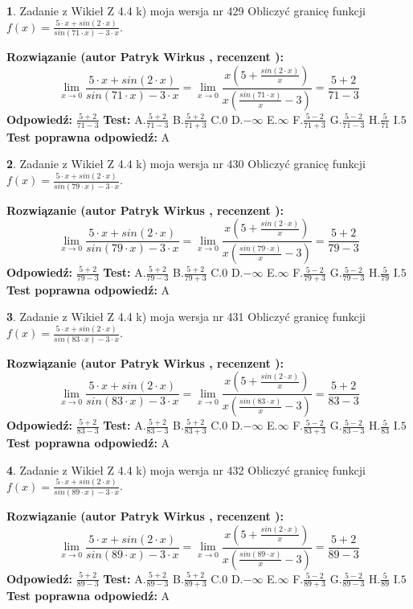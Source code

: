 \documentclass[12pt, a4paper]{article}
\theoremstyle{definition} %
\newtheorem{zad}{}
\newcommand{\zadStart}[1]{\begin{zad}#1\newline}
\newcommand{\zadStop}{\end{zad}}
\newcommand{\rozwStart}[2]{\noindent \textbf{Rozwiązanie (autor #1 , recenzent #2): }\newline}
\newcommand{\rozwStop}{\newline}
\newcommand{\odpStart}{\noindent \textbf{Odpowiedź:}\newline}
\newcommand{\odpStop}{\newline}
\newcommand{\testStart}{\noindent \textbf{Test:}\newline}
\newcommand{\testStop}{\newline}
\newcommand{\kluczStart}{\noindent \textbf{Test poprawna odpowiedź:}\newline}
\newcommand{\kluczStop}{\newline}
\begin{document}
\zadStart{Zadanie z Wikieł Z 4.4 k) moja wersja nr 429}
Obliczyć granicę funkcji $f(x)=\frac{5\cdot x +sin(2\cdot x)}{sin(71\cdot x) -3\cdot x}$.
\zadStop
\rozwStart{Patryk Wirkus}{}
$$\lim\limits_{x\to 0}\frac{5\cdot x +sin(2\cdot x)}{sin(71\cdot x) -3\cdot x}
=\lim\limits_{x\to 0}\frac{x(5+\frac{sin(2\cdot x)}{x})}{x(\frac{sin(71\cdot x)}{x}-3)}
=\frac{5+2}{71-3}$$
\rozwStop
\odpStart
$\frac{5+2}{71-3}$
\odpStop
\testStart
A.$\frac{5+2}{71-3}$
B.$\frac{5+2}{71+3}$
C.$0$
D.$-\infty$
E.$\infty$
F.$\frac{5-2}{71+3}$
G.$\frac{5-2}{71-3}$
H.$\frac{5}{71}$
I.$5$
\testStop
\kluczStart
A
\kluczStop



\zadStart{Zadanie z Wikieł Z 4.4 k) moja wersja nr 430}
Obliczyć granicę funkcji $f(x)=\frac{5\cdot x +sin(2\cdot x)}{sin(79\cdot x) -3\cdot x}$.
\zadStop
\rozwStart{Patryk Wirkus}{}
$$\lim\limits_{x\to 0}\frac{5\cdot x +sin(2\cdot x)}{sin(79\cdot x) -3\cdot x}
=\lim\limits_{x\to 0}\frac{x(5+\frac{sin(2\cdot x)}{x})}{x(\frac{sin(79\cdot x)}{x}-3)}
=\frac{5+2}{79-3}$$
\rozwStop
\odpStart
$\frac{5+2}{79-3}$
\odpStop
\testStart
A.$\frac{5+2}{79-3}$
B.$\frac{5+2}{79+3}$
C.$0$
D.$-\infty$
E.$\infty$
F.$\frac{5-2}{79+3}$
G.$\frac{5-2}{79-3}$
H.$\frac{5}{79}$
I.$5$
\testStop
\kluczStart
A
\kluczStop



\zadStart{Zadanie z Wikieł Z 4.4 k) moja wersja nr 431}
Obliczyć granicę funkcji $f(x)=\frac{5\cdot x +sin(2\cdot x)}{sin(83\cdot x) -3\cdot x}$.
\zadStop
\rozwStart{Patryk Wirkus}{}
$$\lim\limits_{x\to 0}\frac{5\cdot x +sin(2\cdot x)}{sin(83\cdot x) -3\cdot x}
=\lim\limits_{x\to 0}\frac{x(5+\frac{sin(2\cdot x)}{x})}{x(\frac{sin(83\cdot x)}{x}-3)}
=\frac{5+2}{83-3}$$
\rozwStop
\odpStart
$\frac{5+2}{83-3}$
\odpStop
\testStart
A.$\frac{5+2}{83-3}$
B.$\frac{5+2}{83+3}$
C.$0$
D.$-\infty$
E.$\infty$
F.$\frac{5-2}{83+3}$
G.$\frac{5-2}{83-3}$
H.$\frac{5}{83}$
I.$5$
\testStop
\kluczStart
A
\kluczStop



\zadStart{Zadanie z Wikieł Z 4.4 k) moja wersja nr 432}
Obliczyć granicę funkcji $f(x)=\frac{5\cdot x +sin(2\cdot x)}{sin(89\cdot x) -3\cdot x}$.
\zadStop
\rozwStart{Patryk Wirkus}{}
$$\lim\limits_{x\to 0}\frac{5\cdot x +sin(2\cdot x)}{sin(89\cdot x) -3\cdot x}
=\lim\limits_{x\to 0}\frac{x(5+\frac{sin(2\cdot x)}{x})}{x(\frac{sin(89\cdot x)}{x}-3)}
=\frac{5+2}{89-3}$$
\rozwStop
\odpStart
$\frac{5+2}{89-3}$
\odpStop
\testStart
A.$\frac{5+2}{89-3}$
B.$\frac{5+2}{89+3}$
C.$0$
D.$-\infty$
E.$\infty$
F.$\frac{5-2}{89+3}$
G.$\frac{5-2}{89-3}$
H.$\frac{5}{89}$
I.$5$
\testStop
\kluczStart
A
\kluczStop
\end{document}
